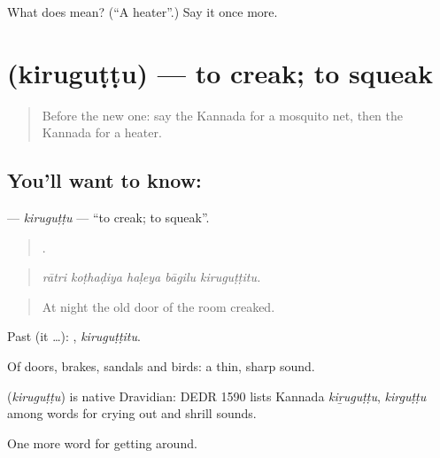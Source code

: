 \begin{tcolorbox}[breakable,colback=teal!4,colframe=teal!35!black,title={Before you move on}]
What does  mean? (\textquotedblleft{}A heater\textquotedblright{}.) Say it once more.
\end{tcolorbox}
\section[\texorpdfstring{\kn{ಕಿರುಗುಟ್ಟು} (kiruguṭṭu)}{ಕಿರುಗುಟ್ಟು (kiruguṭṭu)}]{ (kiruguṭṭu) — to creak; to squeak}

\label{lesson:KA-C462-kiruguttu}



\begin{quote}
Before the new one: say the Kannada for a mosquito net, then the Kannada for a heater.
\end{quote}

\subsection*{You'll want to know: }
\textbf{} — \emph{kiruguṭṭu} — \textquotedblleft{}to creak; to squeak\textquotedblright{}.

\begin{quote}
    .
\end{quote}

\begin{quote}
\emph{rātri koṭhaḍiya haḷeya bāgilu kiruguṭṭitu.}
\end{quote}

\begin{quote}
At night the old door of the room creaked.
\end{quote}

Past (it …): , \emph{kiruguṭṭitu}.

Of doors, brakes, sandals and birds: a thin, sharp sound.

\begin{cousinweb}
\textbf{} (\emph{kiruguṭṭu}) is native Dravidian: DEDR 1590 lists Kannada \emph{kiṟuguṭṭu}, \emph{kirguṭṭu} among words for crying out and shrill sounds.
\end{cousinweb}

\begin{grammarlens}[title={What you've built}]
One more word for getting around.
\end{grammarlens}


